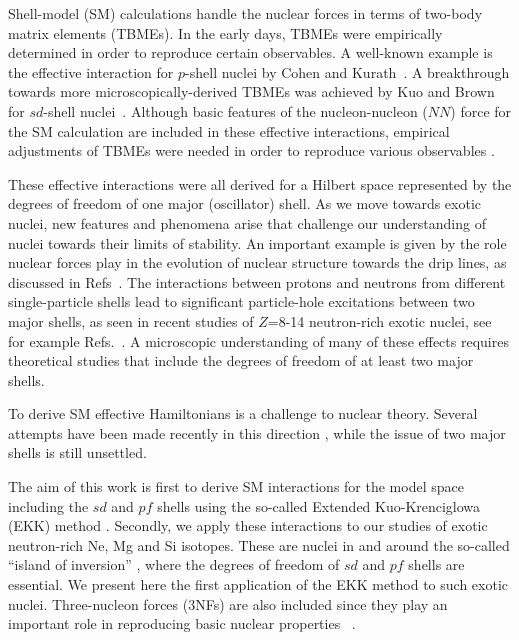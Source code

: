 \documentclass[aps,prl,twocolumn,groupedaddress,showkeys,showpacs,floatfix,superscriptaddress]{revtex4-1}
\newcommand\+{^\dagger}
\begin{document}
Shell-model (SM) calculations handle the
nuclear forces in terms of two-body matrix elements (TBMEs).  
In the early days, TBMEs were empirically
determined in order to reproduce certain observables.  
A well-known example is the effective interaction for
$p$-shell nuclei by Cohen and Kurath~\cite{Cohen:1965kz}.  A
breakthrough towards more microscopically-derived TBMEs was
achieved by Kuo and Brown for $sd$-shell nuclei~\cite{KuoBrown}.
Although basic features of the nucleon-nucleon ($NN$) force for the SM calculation 
are included in these effective interactions, empirical adjustments of TBMEs
were needed in order to reproduce various observables 
\cite{Brown1988191,RevModPhys.77.427,PhysRevC.65.061301}.

These effective interactions were all derived for a Hilbert
space represented by the degrees of freedom of one major (oscillator) 
shell. As we move towards exotic nuclei,
new features and phenomena arise that challenge our understanding of nuclei towards their limits of stability.
An important example is given by the role  nuclear forces play in the evolution of nuclear structure towards the drip lines, as discussed  
in Refs~\cite{PhysRevLett.95.232502,Otsuka:2009qs,nobel_otsuka}. The interactions between protons and neutrons from different single-particle shells
lead to significant particle-hole excitations between two major shells, as seen 
in recent studies of $Z$=8-14 neutron-rich exotic nuclei, see for example Refs.~\cite{PhysRevLett.95.232502,Otsuka:2009qs,nobel_otsuka,Sorlin:2008er,Gade:2008we,Campi:1975un,Warburton:1990vw,Fukunishi:1992ic,PhysRevC.60.054315,Caurier:2013aoa,RevModPhys.77.427}. 
A microscopic understanding of many of these effects requires theoretical studies that include the degrees of
freedom of at least two major shells. 

To derive SM effective Hamiltonians 
is a challenge to nuclear theory. Several attempts have
been made recently in this direction
\cite{LisetskiyPhysRevC78,Bogner.PhysRevLett113,PhysRevLett.113.142502,Coraggio:2013dm,Coraggio:2014cf,Simonis2015,Jansen2015},
while the issue of two major shells is still unsettled. 

The aim of this work is first to derive SM interactions for the model space including the  $sd$ and $pf$ shells 
using the so-called Extended Kuo-Krenciglowa
(EKK) method \cite{Takayanagi201161,Takayanagi:2011dv,Tsunoda:2014hj}. Secondly, we apply these interactions to our studies
of exotic neutron-rich Ne, Mg and Si isotopes. These are nuclei in and around 
the so-called ``island of inversion'' \cite{Warburton:1990vw}, 
where the degrees of freedom of $sd$ and $pf$ shells are essential.
We present here the first application of the EKK method to such exotic nuclei. Three-nucleon forces (3NFs) are also included 
since they play an important role in
reproducing basic nuclear properties  
~\cite{PhysRevLett.105.032501,Holt:2012gc,hagen2012a,hagen2012b,Ekstrom:2015gw}.
\end{document}
